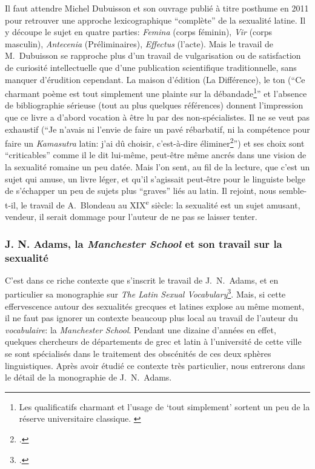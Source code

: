 Il faut attendre Michel Dubuisson et son ouvrage publié à titre posthume en 2011 pour retrouver une approche lexicographique \enquote{complète} de la sexualité latine. Il y découpe le sujet en quatre parties: \textit{Femina} (corps féminin), \textit{Vir} (corps masculin), \textit{Antecenia} (Préliminaires), \textit{Effectus} (l'acte). Mais le travail de M.~Dubuisson se rapproche plus d'un travail de vulgarisation ou de satisfaction de curiosité intellectuelle que d'une publication scientifique traditionnelle, sans manquer d'érudition cependant. La maison d'édition (La Différence), le ton (\enquote{Ce charmant poème est tout simplement une plainte sur la débandade\footnote{Les qualificatifs charmant et l'usage de \enquote{tout simplement} sortent un peu de la réserve universitaire classique. \textcite[p.~21]{dubuisson_lasciva_2011}}} et l'absence de bibliographie sérieuse (tout au plus quelques références) donnent l'impression que ce livre a d'abord vocation à être lu par des non-spécialistes. Il ne se veut pas exhaustif (\enquote{Je n'avais ni l'envie de faire un pavé rébarbatif, ni la compétence pour faire un \textit{Kamasutra} latin: j'ai dû choisir, c'est-à-dire éliminer\footcite[p.~13]{dubuisson_lasciva_2011}}) et ses choix sont \enquote{criticables} comme il le dit lui-même, peut-être même ancrés dans une vision de la sexualité romaine un peu datée. Mais l'on sent, au fil de la lecture, que c'est un sujet qui amuse, un livre léger, et qu'il s'agissait peut-être pour le linguiste belge de s'échapper un peu de sujets plus \enquote{graves} liés au latin. Il rejoint, nous semble-t-il, le travail de A.~Blondeau au XIX\textsuperscript{e} siècle: la sexualité est un sujet amusant, vendeur, il serait dommage pour l'auteur de ne pas se laisser tenter.


\subsubsection{J. N. Adams, la \textit{Manchester School} et son travail sur la sexualité}

C'est dans ce riche contexte que s'inscrit le travail de J.~N.~Adams, et en particulier sa monographie sur \textit{The Latin Sexual Vocabulary}\footcite{adams}. Mais, si cette effervescence autour des sexualités grecques et latines explose au même moment, il ne faut pas ignorer un contexte beaucoup plus local au travail de l'auteur du \textit{vocabulaire}: la \textit{Manchester School}. Pendant une dizaine d'années en effet, quelques chercheurs de départements de grec et latin à l'université de cette ville se sont spécialisés dans le traitement des obscénités de ces deux sphères linguistiques. Après avoir étudié ce contexte très particulier, nous entrerons dans le détail de la monographie de J.~N.~Adams.

